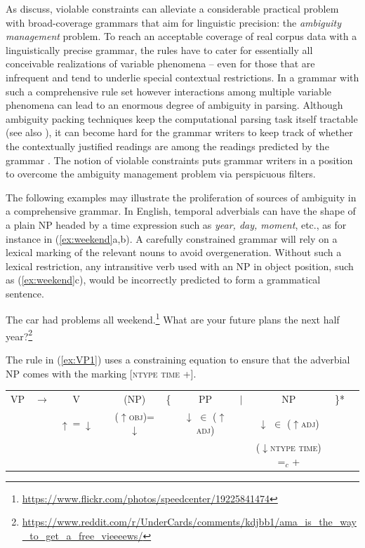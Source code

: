 \documentclass[output=paper,hidelinks]{langscibook}
\begin{document}
As \citet{franketal01} discuss, violable constraints can alleviate a considerable practical problem with broad-coverage grammars that aim for linguistic precision: the \emph{ambiguity management} problem.
To reach an acceptable coverage of real corpus data with a linguistically precise grammar, the rules have to cater for essentially all conceivable realizations of variable phenomena -- even for those that are infrequent and tend to underlie special contextual restrictions. In a grammar with such a comprehensive rule set however interactions among multiple variable phenomena can lead to an enormous degree of ambiguity in parsing. Although ambiguity packing techniques keep the computational parsing task itself tractable \citep{maxwellkaplan89} (see also ), it can become hard for the grammar writers to keep track of whether the contextually justified readings are among the readings predicted by the grammar \citep{kingetal04}. 
The notion of violable constraints puts grammar writers in a position to overcome the ambiguity management problem via perspicuous filters. 

The following examples may illustrate the proliferation of sources of ambiguity in a comprehensive grammar. In English, temporal adverbials can have the shape of a plain NP headed by a time expression such as \emph{year, day, moment}, etc., as for instance in (\ref{ex:weekend}a,b).
A carefully constrained grammar will rely on a lexical marking of the relevant nouns to avoid overgeneration.   Without such a lexical restriction, any intransitive verb used with an NP in object position, such as (\ref{ex:weekend}c), would be incorrectly predicted to form a grammatical sentence. 

\ea\label{ex:weekend}
\ea The car had problems all weekend.\footnote{\url{https://www.flickr.com/photos/speedcenter/19225841474}}
\ex What are your future plans the next half year?\footnote{\url{https://www.reddit.com/r/UnderCards/comments/kdjbb1/ama_is_the_way_to_get_a_free_vieeeews/}}
\z
\z

\noindent
The rule in (\ref{ex:VP1}) uses a constraining equation to ensure that the adverbial NP comes with the marking [\textsc{ntype time} +]. 

\ea \label{ex:VP1}
\setlength{\tabcolsep}{3pt}
\begin{tabular}[t]{ccccccccccc}
 VP & $\rightarrow$ & V & & (NP) & \{ &  PP & $|$ & NP & \}* \\
    & &  $\uparrow=\downarrow$ & & ($\uparrow$\textsc{obj})=$\downarrow$ & &   $\downarrow$ $\in$ ($\uparrow$\textsc{adj}) & & $\downarrow$ $\in$ ($\uparrow$\textsc{adj})\\    
    & & & & & & & & ($\downarrow$\textsc{ntype time}) =$_c$ + \\
\end{tabular}
\z
\end{document}
